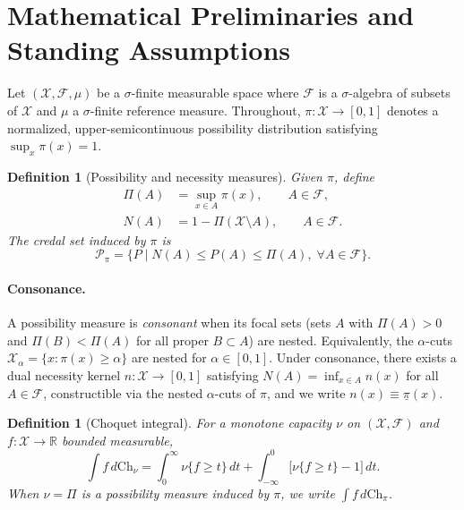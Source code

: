 \documentclass[12pt]{article}
\newtheorem{definition}[theorem]{Definition}
\newcommand{\Ppi}{\mathcal{P}_\pi}
\newcommand{\calF}{\mathcal{F}}
\newcommand{\calX}{\mathcal{X}}
\newcommand{\R}{\mathbb{R}}
\begin{document}
\section{Mathematical Preliminaries and Standing Assumptions}
\label{sec:prelim}

Let $(\calX,\calF,\mu)$ be a $\sigma$-finite measurable space where $\calF$ is
a $\sigma$-algebra of subsets of $\calX$ and $\mu$ a $\sigma$-finite reference
measure.
Throughout, $\pi:\calX\to[0,1]$ denotes a normalized, upper-semi\-continuous
possibility distribution satisfying $\sup_{x}\pi(x)=1$.

\begin{definition}[Possibility and necessity measures]
\label{def:pos_nec}
Given $\pi$, define
\begin{align}
\Pi(A) &= \sup_{x\in A}\pi(x), \qquad A\in\calF, \label{eq:pos}\\
N(A) &= 1-\Pi(\calX\setminus A), \qquad A\in\calF. \label{eq:nec}
\end{align}
The \emph{credal set} induced by $\pi$ is
\begin{equation}
\Ppi = \bigl\{P \;\big|\; N(A)\le P(A)\le\Pi(A),\;\forall A\in\calF\bigr\}.
\label{eq:credal}
\end{equation}
\end{definition}

\paragraph{Consonance.}
A possibility measure is \emph{consonant} when its focal sets (sets $A$ with
$\Pi(A)>0$ and $\Pi(B)<\Pi(A)$ for all proper $B\subset A$) are nested.
Equivalently, the $\alpha$-cuts $\calX_\alpha = \{x:\pi(x)\ge\alpha\}$ are
nested for $\alpha\in[0,1]$.
Under consonance, there exists a dual necessity kernel $n:\calX\to[0,1]$
satisfying $N(A)=\inf_{x\in A}n(x)$ for all $A\in\calF$, constructible via
the nested $\alpha$-cuts of $\pi$, and we write $n(x)\equiv\underline{\pi}(x)$.

\begin{definition}[Choquet integral]
For a monotone capacity $\nu$ on $(\calX,\calF)$ and $f:\calX\to\R$ bounded
measurable,
\begin{equation}
\int f\,d\mathrm{Ch}_\nu
= \int_0^\infty \nu\{f\ge t\}\,dt
+ \int_{-\infty}^0 \bigl[\nu\{f\ge t\}-1\bigr]\,dt.
\label{eq:choquet}
\end{equation}
When $\nu=\Pi$ is a possibility measure induced by $\pi$, we write
$\int f\,d\mathrm{Ch}_\pi$.
\end{definition}
\end{document}
